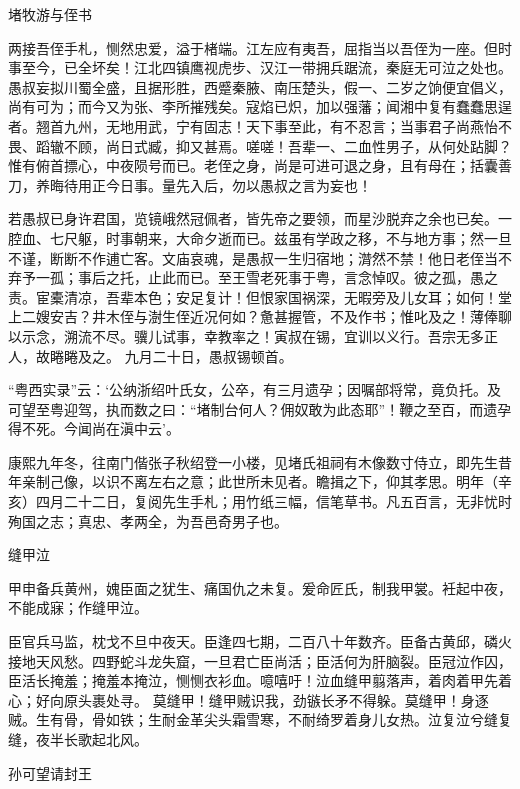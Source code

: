 \documentclass[]{article}
\begin{document}
堵牧游与侄书

两接吾侄手札，恻然忠爱，溢于楮端。江左应有夷吾，屈指当以吾侄为一座。但时事至今，已全坏矣！江北四镇鹰视虎步、汉江一带拥兵踞流，秦庭无可泣之处也。愚叔妄拟川蜀全盛，且据形胜，西蹙秦腋、南压楚头，假一、二岁之饷便宜倡义，尚有可为；而今又为张、李所摧残矣。寇焰已炽，加以强藩；闻湘中复有蠢蠢思逞者。翘首九州，无地用武，宁有固志！天下事至此，有不忍言；当事君子尚燕怡不畏、蹈辙不顾，尚日式臧，抑又甚焉。嗟嗟！吾辈一、二血性男子，从何处跕脚？惟有俯首摽心，中夜陨号而已。老侄之身，尚是可进可退之身，且有母在；括囊善刀，养晦待用正今日事。量先入后，勿以愚叔之言为妄也！

若愚叔已身许君国，览镜峨然冠佩者，皆先帝之要领，而星沙脱弃之余也已矣。一腔血、七尺躯，时事朝来，大命夕逝而已。兹虽有学政之移，不与地方事；然一旦不谨，断断不作逋亡客。文庙哀魂，是愚叔一生归宿地；潸然不禁！他日老侄当不弃予一孤；事后之托，止此而已。至王雪老死事于粤，言念悼叹。彼之孤，愚之责。宦橐清凉，吾辈本色；安足复计！但恨家国祸深，无暇旁及儿女耳；如何！堂上二嫂安吉？井木侄与澍生侄近况何如？惫甚握管，不及作书；惟叱及之！薄俸聊以示念，溯流不尽。骥儿试事，幸教率之！寅叔在锡，宜训以义行。吾宗无多正人，故睠睠及之。
九月二十日，愚叔锡顿首。

``粤西实录''云：`公纳浙绍叶氏女，公卒，有三月遗孕；因嘱部将常，竟负托。及可望至粤迎驾，执而数之曰：``堵制台何人？佣奴敢为此态耶''！鞭之至百，而遗孕得不死。今闻尚在滇中云'。

康熙九年冬，往南门偕张子秋绍登一小楼，见堵氏祖祠有木像数寸侍立，即先生昔年亲制己像，以识不离左右之意；此世所未见者。瞻揖之下，仰其孝思。明年（辛亥）四月二十二日，复阅先生手札；用竹纸三幅，信笔草书。凡五百言，无非忧时殉国之志；真忠、孝两全，为吾邑奇男子也。

缝甲泣

甲申备兵黄州，媿臣面之犹生、痛国仇之未复。爰命匠氏，制我甲裳。衽起中夜，不能成寐；作缝甲泣。

臣官兵马监，枕戈不旦中夜天。臣逢四七期，二百八十年数齐。臣备古黄邱，磷火接地天风愁。四野蛇斗龙失窟，一旦君亡臣尚活；臣活何为肝脑裂。臣冠泣作囚，臣活长掩羞；掩羞本掩泣，恻恻衣衫血。噫嘻吁！泣血缝甲翦落声，着肉着甲先着心；好向原头裹处寻。
莫缝甲！缝甲贼识我，劲镞长矛不得躲。莫缝甲！身逐贼。生有骨，骨如铁；生耐金革尖头霜雪寒，不耐绮罗着身儿女热。泣复泣兮缝复缝，夜半长歌起北风。

孙可望请封王
\end{document}

